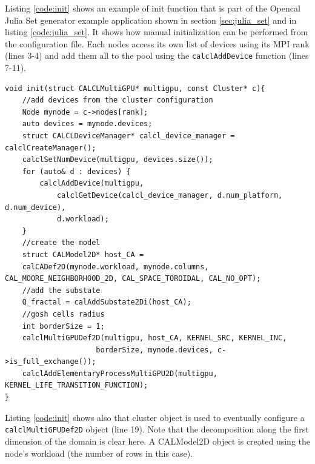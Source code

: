 Listing \ref{code:init} shows an example of init function that is part of the Opencal Julia Set generator example application shown in section \ref{sec:julia_set} and in listing \ref{code:julia_set}. It shows how manual initialization can be performed from the configuration file. Each nodes access its own list of devices using its MPI rank (lines 3-4)  and add them all to the pool using the \texttt{calclAddDevice} function (lines 7-11).
\begin{lstlisting}
void init(struct CALCLMultiGPU* multigpu, const Cluster* c){
	//add devices from the cluster configuration
	Node mynode = c->nodes[rank];
	auto devices = mynode.devices;
	struct CALCLDeviceManager* calcl_device_manager = calclCreateManager();
	calclSetNumDevice(multigpu, devices.size());
	for (auto& d : devices) {
		calclAddDevice(multigpu, 
			calclGetDevice(calcl_device_manager, d.num_platform, d.num_device),
			d.workload);
	}
	//create the model	
	struct CALModel2D* host_CA =
	calCADef2D(mynode.workload, mynode.columns, CAL_MOORE_NEIGHBORHOOD_2D, CAL_SPACE_TOROIDAL, CAL_NO_OPT);
	//add the substate
	Q_fractal = calAddSubstate2Di(host_CA);
	//gosh cells radius
	int borderSize = 1;
	calclMultiGPUDef2D(multigpu, host_CA, KERNEL_SRC, KERNEL_INC,
					 borderSize, mynode.devices, c->is_full_exchange());
	calclAddElementaryProcessMultiGPU2D(multigpu, 	KERNEL_LIFE_TRANSITION_FUNCTION);
}
\end{lstlisting}
Listing \ref{code:init} shows also that cluster object is used to eventually configure a \texttt{calclMultiGPUDef2D} object (line 19). 
Note that the decomposition along the first dimension of the domain is clear here. A CALModel2D object is created using the node's workload (the number of rows in this case).

